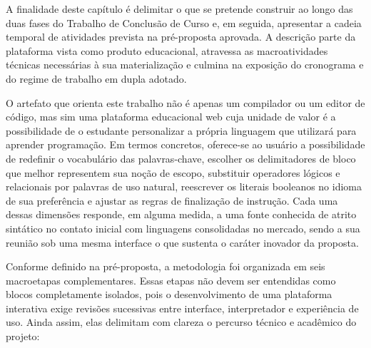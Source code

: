 
A finalidade deste capítulo é delimitar o que se pretende construir ao longo das duas fases do Trabalho de Conclusão de Curso e, em seguida, apresentar a cadeia temporal de atividades prevista na pré-proposta aprovada. A descrição parte da plataforma vista como produto educacional, atravessa as macroatividades técnicas necessárias à sua materialização e culmina na exposição do cronograma e do regime de trabalho em dupla adotado.

O artefato que orienta este trabalho não é apenas um compilador ou um editor de código, mas sim uma plataforma educacional web cuja unidade de valor é a possibilidade de o estudante personalizar a própria linguagem que utilizará para aprender programação. Em termos concretos, oferece-se ao usuário a possibilidade de redefinir o vocabulário das palavras-chave, escolher os delimitadores de bloco que melhor representem sua noção de escopo, substituir operadores lógicos e relacionais por palavras de uso natural, reescrever os literais booleanos no idioma de sua preferência e ajustar as regras de finalização de instrução. Cada uma dessas dimensões responde, em alguma medida, a uma fonte conhecida de atrito sintático no contato inicial com linguagens consolidadas no mercado, sendo a sua reunião sob uma mesma interface o que sustenta o caráter inovador da proposta.

Conforme definido na pré-proposta, a metodologia foi organizada em seis macroetapas complementares. Essas etapas não devem ser entendidas como blocos completamente isolados, pois o desenvolvimento de uma plataforma interativa exige revisões sucessivas entre interface, interpretador e experiência de uso. Ainda assim, elas delimitam com clareza o percurso técnico e acadêmico do projeto:

